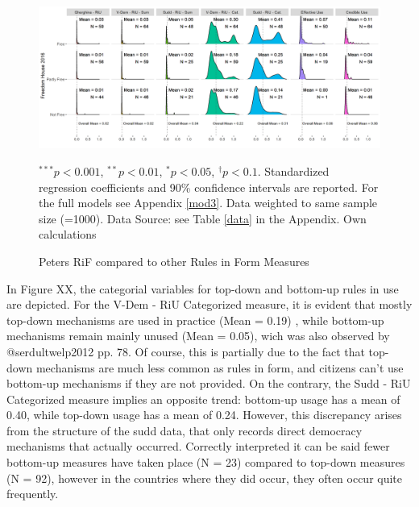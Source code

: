 \documentclass{systats}
\begin{document}
\begin{figure}
	\caption{Peters RiF compared to other Rules in Form Measures}
	\label{reg2}
	\includegraphics[width=\textwidth]{images/coef_riu2.png}
	\flushright
	{\scriptsize $^{***}p<0.001$, $^{**}p<0.01$, $^*p<0.05$, $^{\dagger}p<0.1$. Standardized regression coefficients and 90\% confidence intervals are reported. For the full models see Appendix \ref{mod3}. Data weighted to same sample size (=1000). Data Source: see Table \ref{data} in the Appendix. Own calculations  \par}
\end{figure}

In Figure XX, the categorial variables for top-down and bottom-up rules in use are depicted. For the V-Dem - RiU Categorized measure, it is evident that mostly top-down mechanisms are used in practice (Mean = 0.19) , while bottom-up mechanisms remain mainly unused (Mean = 0.05), wich was also observed by @serdultwelp2012 pp. 78. Of course, this is partially due to the fact that top-down mechanisms are much less common as rules in form, and citizens can’t use bottom-up mechanisms if they are not provided.  On the contrary, the Sudd - RiU Categorized measure implies an opposite trend: bottom-up usage has a mean of 0.40, while top-down usage has a mean of 0.24. However, this discrepancy arises from the structure of the sudd data, that only records direct democracy mechanisms that actually occurred. Correctly interpreted it can be said fewer bottom-up measures have taken place (N = 23) compared to top-down measures (N = 92), however in the countries where they did occur, they often occur quite frequently.
\end{document}
